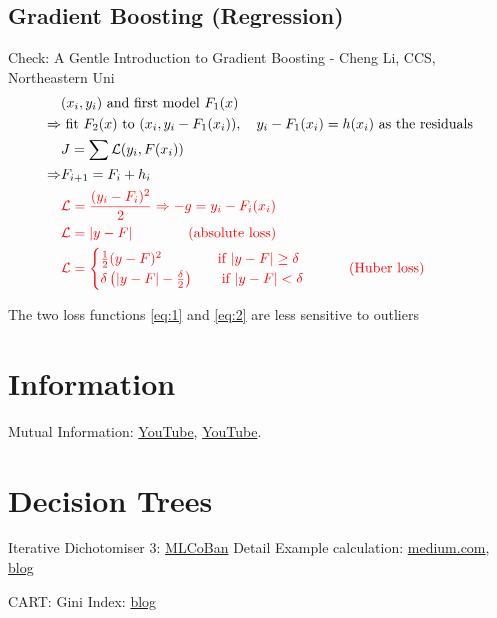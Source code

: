 \subsection{Gradient Boosting (Regression)}
Check: A Gentle Introduction to Gradient Boosting - Cheng Li, CCS, Northeastern Uni
\begin{align}
	& (x_i, y_i) \text{ and first model } F_1(x)\\
	\Rightarrow & \text{ fit } F_2(x) \text{ to } (x_i, y_i - F_1(x_i)), \quad y_i - F_1(x_i)=h(x_i)	\text{ as the residuals}\\
	& J = \sum \mathcal{L} (y_i, F(x_i))\\
	\Rightarrow & F_{i+1} = F_i + h_i\\
	&{\color{red} \mathcal{L} = \frac{(y_i - F_i)^2}{2} \Rightarrow -g = y_i - F_i(x_i)} \\
	\label{eq:1}
	&{\color{red} \mathcal{L} = |y-F| \qquad \qquad \text{(absolute loss)} }\\
	\label{eq:2}
	&{\color{red} \mathcal{L} =\begin{cases}
			\frac{1}{2} (y-F)^2 \qquad\qquad \text{if } |y-F| \geq \delta\\
			\delta \left( |y-F| - \frac{\delta}{2} \right) \qquad \text{if } |y-F| <\delta
	\end{cases} \qquad \text{(Huber loss)}} 
\end{align}

The two loss functions \eqref{eq:1} and \eqref{eq:2} are less sensitive to outliers

\section{Information}

Mutual Information: \href{https://www.youtube.com/watch?v=d7AUaut6hso}{YouTube}, \href{https://www.youtube.com/watch?v=U9h1xkNELvY}{YouTube}.

\section{Decision Trees}

Iterative Dichotomiser 3: \href{https://machinelearningcoban.com/2018/01/14/id3/}{MLCoBan}
Detail Example calculation: \href{https://medium.com/@rishabhjain_22692/decision-trees-it-begins-here-93ff54ef134}{medium.com}, 
\href{https://clearpredictions.com/Home/DecisionTree}{blog}

CART: Gini Index: \href{http://www.learnbymarketing.com/481/decision-tree-flavors-gini-info-gain/}{blog}

